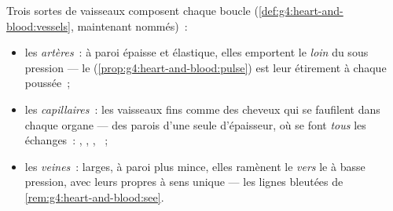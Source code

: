 \begin{definition}\label{def:g7:heart-and-circulation:vessels}
Trois sortes de vaisseaux composent chaque boucle
(\cref{def:g4:heart-and-blood:vessels}, maintenant nommés)~:
\begin{itemize}
  \item les \emph{artères}~: à paroi épaisse et
        élastique, elles emportent le  \emph{loin} du  sous
        pression --- le 
        (\cref{prop:g4:heart-and-blood:pulse}) est leur étirement à
        chaque poussée~;
  \item les \emph{capillaires}~: les vaisseaux
        fins comme des cheveux qui se faufilent dans chaque organe
        --- des parois d'une seule  d'épaisseur, où se font
        \emph{tous} les échanges~: , , ,
        ~;
  \item les \emph{veines}~: larges, à paroi plus mince,
        elles ramènent le  \emph{vers} le  à basse pression,
        avec leurs propres  à sens unique --- les lignes
        bleutées de \cref{rem:g4:heart-and-blood:see}.
\end{itemize}
\end{definition}

